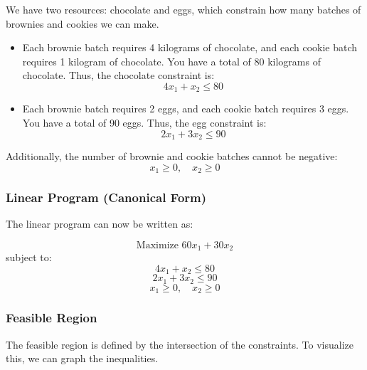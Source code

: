 \documentclass[11pt]{article}
\begin{document}
We have two resources: chocolate and eggs, which constrain how many batches of brownies and cookies we can make.
\begin{itemize}
    \item Each brownie batch requires 4 kilograms of chocolate, and each cookie batch requires 1 kilogram of chocolate. You have a total of 80 kilograms of chocolate. Thus, the chocolate constraint is:
    \[
    4x_1 + x_2 \leq 80
    \]
    \item Each brownie batch requires 2 eggs, and each cookie batch requires 3 eggs. You have a total of 90 eggs. Thus, the egg constraint is:
    \[
    2x_1 + 3x_2 \leq 90
    \]
\end{itemize}

Additionally, the number of brownie and cookie batches cannot be negative:
\[
x_1 \geq 0, \quad x_2 \geq 0
\]

\subsubsection*{Linear Program (Canonical Form)}

The linear program can now be written as:

\[
\text{Maximize } 60x_1 + 30x_2
\]
subject to:
\[
4x_1 + x_2 \leq 80
\]
\[
2x_1 + 3x_2 \leq 90
\]
\[
x_1 \geq 0, \quad x_2 \geq 0
\]

\subsubsection*{Feasible Region}

The feasible region is defined by the intersection of the constraints. To visualize this, we can graph the inequalities.

\begin{center}
\end{center}
\end{document}
